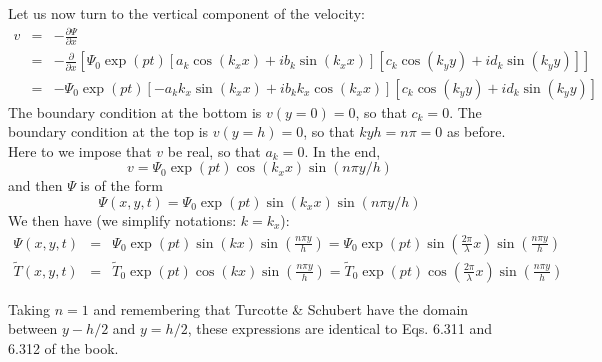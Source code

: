 Let us now turn to the vertical component of the velocity:
\begin{eqnarray}
v 
&=& -\frac{\partial \Psi}{\partial x}  \\
&=& -\frac{\partial }{\partial x} \left[  \Psi_0 \exp(pt) 
\left[a_k \cos(k_x x) + i b_k \sin(k_x x) \right]
\left[c_k \cos(k_y y) + i d_k \sin(k_y y) \right] 
\right] \\
&=& - \Psi_0 \exp(pt) 
\left[- a_k k_x \sin(k_x x) + i b_k k_x \cos(k_x x) \right]
\left[c_k \cos(k_y y) + i d_k \sin(k_y y) \right] 
\end{eqnarray}
The boundary condition at the bottom is $v(y=0)=0$, so that $c_k=0$.
The boundary condition at the top is $v(y=h)=0$, so that $ky h = n \pi=0$ as before.
Here to we impose that $v$ be real, so that $a_k=0$.
In the end,
\[
v =  \Psi_0 \exp(pt) \cos (k_x x) \sin(n \pi y /h)
\]
and then $\Psi$ is of the form
\[
\Psi(x,y,t) = \Psi_0 \exp(pt) \sin(k_x x) \sin(n\pi y/h)
\]
We then have (we simplify notations: $k=k_x$):
\begin{eqnarray}
\Psi(x,y,t) 
&=& \Psi_0 \exp(pt)  \sin(k x) \sin(\frac{n\pi y}{h})   
= \Psi_0 \exp(pt)  \sin(\frac{2\pi}{\lambda} x) \sin(\frac{n\pi y}{h})  \\ 
\tilde{T}(x,y,t)  
&=& \tilde{T}_0 \exp(pt)  \cos(k x) \sin(\frac{n\pi y}{h})   
= \tilde{T}_0 \exp(pt)  \cos(\frac{2\pi}{\lambda} x) \sin(\frac{n\pi y}{h})   
\end{eqnarray}
\begin{remark}
Taking $n=1$ and remembering that Turcotte \& Schubert have the domain between 
$y-h/2$ and $y=h/2$, these expressions are identical to Eqs. 6.311 and 6.312 
of the book. 
\end{remark}


